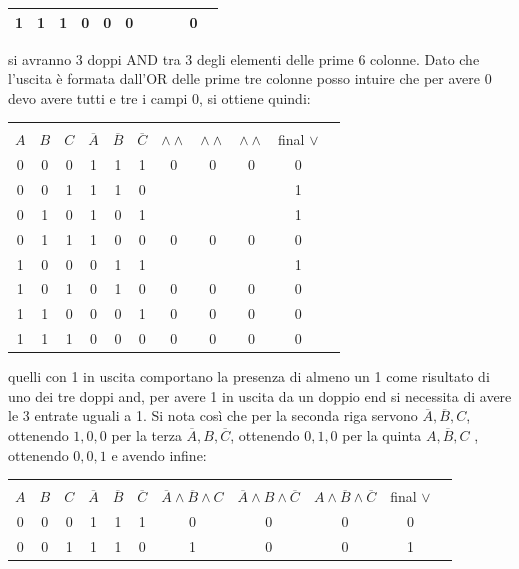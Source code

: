 \documentclass[a4paper,12pt, oneside]{book}
\begin{document}
\begin{esercizio}
\begin{center}
\begin{tabular}{|c|c|c|c|c|c|c|c|c|c|c|}
1 & 1 & 1 & 0 & 0 & 0 &  &  &  &  0\\
\hline
\end{tabular}
\end{center}
si avranno 3 doppi AND tra 3 degli elementi delle prime 6 colonne. Dato che l'uscita è formata dall'OR delle prime tre colonne posso intuire che per avere 0 devo avere tutti e tre i campi 0, si ottiene quindi:
 \begin{center}
\begin{tabular}{|c|c|c|c|c|c|c|c|c|c|c|}
\hline 
& & & & & & & & & \\
$A$ & $B$ & $C$ & $\overline{A}$ & $\overline{B}$ & $\overline{C}$ & $\wedge \wedge $  & $\wedge \wedge $ & $\wedge \wedge$ & final $\vee$\\
\hline
0 & 0 & 0 & 1 & 1 & 1 & 0 & 0 & 0 &  0\\
\hline
0 & 0 & 1 & 1 & 1 & 0 &  &  &  &  1\\
\hline
0 & 1 & 0 & 1 & 0 & 1 &  &  &  &  1\\
\hline
0 & 1 & 1 & 1 & 0 & 0 & 0 & 0 & 0 &  0\\
\hline
1 & 0 & 0 & 0 & 1 & 1 &  &  &  &  1\\
\hline
1 & 0 & 1 & 0 & 1 & 0 & 0 & 0 & 0 &  0\\
\hline
1 & 1 & 0 & 0 & 0 & 1 & 0 & 0 & 0 &  0\\
\hline
1 & 1 & 1 & 0 & 0 & 0 & 0 & 0 & 0 &  0\\
\hline
\end{tabular}
\end{center}
quelli con 1 in uscita comportano la presenza di almeno un 1 come risultato di uno dei tre doppi and, per avere 1 in uscita da un doppio end si necessita di avere le 3 entrate uguali a 1. Si nota così che per la seconda riga servono $\overline{A},\overline{B},C$, ottenendo $1,0,0$  per la terza $\overline{A}, B, \overline{C}$, ottenendo $0,1,0$ per la quinta $A, \overline{B}, C$ , ottenendo $0,0,1$ e avendo infine:
\begin{center}
\begin{tabular}{|c|c|c|c|c|c|c|c|c|c|c|}
\hline 
& & & & & & & & & \\
$A$ & $B$ & $C$ & $\overline{A}$ & $\overline{B}$ & $\overline{C}$ & $\overline{A}\wedge \overline{B}\wedge C$  & $\overline{A}\wedge B\wedge\overline{C} $ & $A\wedge \overline{B}\wedge\overline{C}$ & final $\vee$\\
\hline
0 & 0 & 0 & 1 & 1 & 1 & 0 & 0 & 0 &  0\\
\hline
0 & 0 & 1 & 1 & 1 & 0 & 1 & 0 & 0 &  1\\

\end{tabular}
\end{center}
\end{esercizio}
\end{document}
